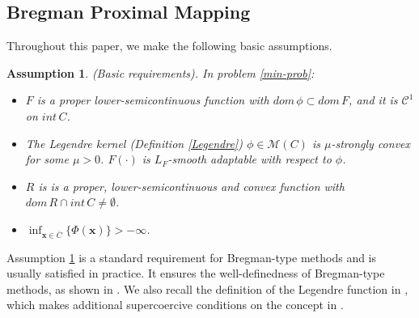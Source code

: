 \documentclass[twoside,11pt]{article}
\newcommand{\cC}{\mathcal C}
\newcommand{\cD}{\mathcal D}
\newcommand{\cM}{\mathcal M}
\def\inprod#1#2{\langle#1,\,#2\rangle}
\newtheorem{assumption}{Assumption}%
\def\vg{{\bm{g}}}
\def\vu{{\bm{u}}}
\def\vx{{\bm{x}}}
\def\vy{{\bm{y}}}
\begin{document}
\subsection{Bregman Proximal Mapping}\label{subsec-Bregman-Proximal-mapping}
Throughout this paper, we make the following basic assumptions.
\begin{assumption}\label{relative-smooth-assumption}
(Basic requirements). In problem \eqref{min-prob}:
\begin{itemize}
 \item[A1.]  $F$ is a proper lower-semicontinuous function with $dom\,\phi\subset dom\,F$, {and it} is $\cC^1$ on $int\,C$.
 \item[A2.] The Legendre kernel (Definition \ref{Legendre}) $\phi\in\cM(C)$ is $\mu$-strongly convex {for some} $\mu>0$.  $F(\cdot)$ is $L_F$-smooth adaptable with respect to $\phi$.
 \item[A3.] $R$ is is a proper, lower-semicontinuous and convex function with $dom\,R\cap int\,C\neq\emptyset$.
 \item[A4.] $\inf_{\vx\in\overline{C}}\{\Phi(\vx)\}>-\infty$.  %
\end{itemize}
\end{assumption}
 Assumption \ref{relative-smooth-assumption} is a standard requirement for Bregman-type methods and is usually satisfied in practice. 
 It ensures the well-definedness of Bregman-type methods, as shown in \citep{bolte2018first,latafat2022bregman}. We also recall the definition of the Legendre function in \citep{latafat2022bregman}, which makes additional supercoercive conditions on the concept in \citep{rockafellar1997convex}. %
\end{document}
